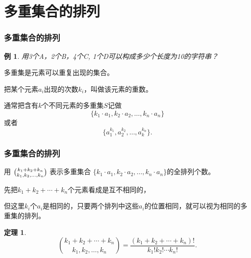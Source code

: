 \documentclass[13pt, punct]{ctexbeamer}
\newtheorem{thm}{定理}[section]
\newtheorem{ex}{例}[section]
\begin{document}
%
%
%



\section{多重集合的排列}
\begin{frame}\frametitle{多重集合的排列}


	\begin{ex}
		用3个A，2个B，4个C, 1个D可以构成多少个长度为10的字符串？
	\end{ex}
	\pause
\alert{多重集}是元素可以重复出现的集合。

把某个元素$a_i$出现的次数$k_i$，叫做该元素的重数。

通常把含有$k$个不同元素的多重集$S$记做
$$\{ k_1 \cdot a_1, k_2 \cdot a_2, \ldots, k_n \cdot a_n \}$$
或者
$$\{ a_1^{k_1}, a_2^{k_2}, \ldots, a_k^{k_n} \}.$$
\end{frame}


\begin{frame}\frametitle{多重集合的排列}
用
$\Large{k_1+ k_2+k_n\choose k_1, k_2, \ldots, k_n}$
表示多重集合
$\{ k_1 \cdot a_1, k_2 \cdot a_2, \ldots, k_n \cdot a_n \}$的全排列个数。

先把$k_1+k_2+\cdots+k_n$个元素看成是互不相同的，

但这里$k_i$个$a_i$是相同的，只要两个排列中这些$a_i$的位置相同，就可以视为相同的多重集的排列。


\begin{thm}
$${k_1+k_2+\cdots+k_n \choose k_1, k_2, \ldots, k_n} = \frac{(k_1+k_2+\cdots+k_n)!}{k_1!k_2!\cdots k_n!}. $$
\end{thm}



\end{frame}
\end{document}
